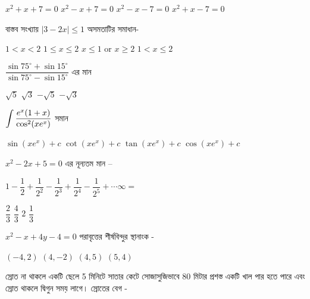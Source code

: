\documentclass[addpoints]{exam}
\begin{document}
\begin{questions}
\begin{oneparchoices}
\choice $ x^{2}+x+7=0 $
\choice $ x^{2}-x+7=0 $
\choice $ x^{2}-x-7=0 $
\choice $ x^{2}+x-7=0 $
\end{oneparchoices}


\question বাস্তব সংখ্যায় $ |3-2x|\le 1 $ অসমতাটির সমাধান-

\begin{oneparchoices}
\choice $ 1<x<2 $
\choice $ 1\le x \le 2 $
\choice $ x\le 1$ or $ x\ge 2 $
\choice $ 1<x\le 2 $
\end{oneparchoices}

\question $ \dfrac{\sin 75^{\circ}+\sin 15^{\circ}}{\sin 75^{\circ}-\sin 15^{\circ}} $ এর মান

\begin{oneparchoices}
\choice $ \sqrt{5} $
\choice $ \sqrt{3} $
\choice $ -\sqrt{5} $
\choice $ -\sqrt{3} $
\end{oneparchoices}

\question $ \mathlarger{\int \dfrac{e^{x}(1+x)}{\cos^{2}(xe^{x})}} $ সমান

\begin{oneparchoices}
\choice $ \sin (xe^{x}) +c $
\choice $ \cot (xe^{x}) +c $
\choice $ \tan (xe^{x}) +c $
\choice $ \cos (xe^{x}) +c$
\end{oneparchoices}

\question  $ x^{2}-2x+5=0 $ এর নূন্যতম মান – 

\begin{oneparchoices}
\end{oneparchoices}

\question  $ 1-\dfrac{1}{2}+\dfrac{1}{2^{2}}-\dfrac{1}{2^{3}}+\dfrac{1}{2^{4}}-\dfrac{1}{2^{5}}+\cdots \infty = $ 

\begin{oneparchoices}
\choice $ \dfrac{2}{3} $
\choice $ \dfrac{4}{3} $
\choice $ 2 $
\choice $ \dfrac{1}{3} $
\end{oneparchoices}

\question $ x^{2}-x+4y-4=0 $ পরাবৃত্তের শীর্ষবিন্দুর স্থানাংক -

\begin{oneparchoices}
\choice $ (-4,2) $
\choice $ (4,-2) $
\choice $ (4,5) $
\choice  $ (5,4) $
\end{oneparchoices}

\question স্রোত না থাকলে একটি ছেলে 5 মিনিটে সাতার কেটে সোজাসুজিভাবে 80 মিটার প্রশস্ত একটি খাল পার হতে পারে এবং স্রোত থাকলে দ্বিগুন সময় লাগে। স্রোতের বেগ -


\end{questions}
\end{document}
